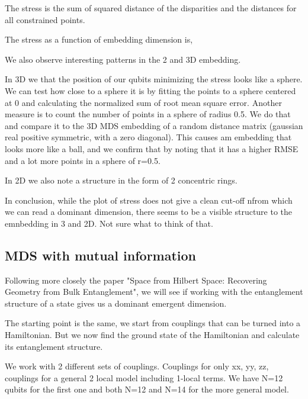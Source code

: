 \documentclass{article}
\begin{document}
The stress is the sum of squared distance of the disparities and the distances for all constrained points.

The stress as a function of embedding dimension is,
\begin{figure}
    
\end{figure}

We also observe interesting patterns in the 2 and 3D embedding.
\begin{figure}
    
\end{figure}
In 3D we that the position of our qubits minimizing the stress looks like a sphere. We can test how close to a sphere it is by fitting the points to a sphere centered at 0 and calculating the normalized sum of root mean square error. Another measure is to count the number of points in a sphere of radius 0.5.
We do that and compare it to the 3D MDS embedding of a random distance matrix (gaussian real positive symmetric, with a zero diagonal). This causes am embedding that looks more like a ball, and we confirm that by noting that it has a higher RMSE and a lot more points in a sphere of r=0.5.

In 2D we also note a structure in the form of 2 concentric rings.

In conclusion, while the plot of stress does not give a clean cut-off nfrom which we can read a dominant dimension, there seems to be a visible structure to the emnbedding in 3 and 2D.
Not sure what to think of that.

\subsection{MDS with mutual information}

Following more closely the paper "Space from Hilbert Space: Recovering Geometry from Bulk Entanglement", we will see if working with the entanglement structure of a state gives us a dominant emergent dimension.

The starting point is the same, we start from couplings that can be turned into a Hamiltonian. But we now find the ground state of the Hamiltonian and calculate its entanglement structure.

We work with 2 different sets of couplings. Couplings for only xx, yy, zz, couplings for a general 2 local model including 1-local terms. We have N=12 qubits for the first one and both N=12 and N=14 for the more general model. 
\end{document}
